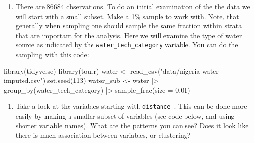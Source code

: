 \documentclass[
  letterpaper,
]{krantz}
\newenvironment{Shaded}{\begin{snugshade}}{\end{snugshade}}
\newcommand{\AttributeTok}[1]{\textcolor[rgb]{0.40,0.45,0.13}{#1}}
\newcommand{\DecValTok}[1]{\textcolor[rgb]{0.68,0.00,0.00}{#1}}
\newcommand{\FloatTok}[1]{\textcolor[rgb]{0.68,0.00,0.00}{#1}}
\newcommand{\FunctionTok}[1]{\textcolor[rgb]{0.28,0.35,0.67}{#1}}
\newcommand{\NormalTok}[1]{\textcolor[rgb]{0.00,0.23,0.31}{#1}}
\newcommand{\OtherTok}[1]{\textcolor[rgb]{0.00,0.23,0.31}{#1}}
\newcommand{\SpecialCharTok}[1]{\textcolor[rgb]{0.37,0.37,0.37}{#1}}
\newcommand{\StringTok}[1]{\textcolor[rgb]{0.13,0.47,0.30}{#1}}
\providecommand{\tightlist}{%
  \setlength{\itemsep}{0pt}\setlength{\parskip}{0pt}}\usepackage{longtable,booktabs,array}
\begin{document}
\begin{enumerate}
\def\labelenumi{\arabic{enumi}.}
\tightlist
\item
  There are 86684 observations. To do an initial examination of the the
  data we will start with a small subset. Make a 1\% sample to work
  with. Note, that generally when sampling one should sample the same
  fraction within strata that are important for the analysis. Here we
  will examine the type of water source as indicated by the
  \texttt{water\_tech\_category} variable. You can do the sampling with
  this code:
\end{enumerate}

\begin{Shaded}
\begin{Highlighting}[]
\FunctionTok{library}\NormalTok{(tidyverse)}
\FunctionTok{library}\NormalTok{(tourr)}
\NormalTok{water }\OtherTok{\textless{}{-}} \FunctionTok{read\_csv}\NormalTok{(}\StringTok{"data/nigeria{-}water{-}imputed.csv"}\NormalTok{)}
\FunctionTok{set.seed}\NormalTok{(}\DecValTok{113}\NormalTok{)}
\NormalTok{water\_sub }\OtherTok{\textless{}{-}}\NormalTok{ water }\SpecialCharTok{|\textgreater{}}
  \FunctionTok{group\_by}\NormalTok{(water\_tech\_category) }\SpecialCharTok{|\textgreater{}}
  \FunctionTok{sample\_frac}\NormalTok{(}\AttributeTok{size =} \FloatTok{0.01}\NormalTok{)}
\end{Highlighting}
\end{Shaded}

\begin{enumerate}
\def\labelenumi{\arabic{enumi}.}
\setcounter{enumi}{1}
\tightlist
\item
  Take a look at the variables starting with \texttt{distance\_}. This
  can be done more easily by making a smaller subset of variables (see
  code below, and using shorter variable names). What are the patterns
  you can see? Does it look like there is much association between
  variables, or clustering?
\end{enumerate}
\end{document}
